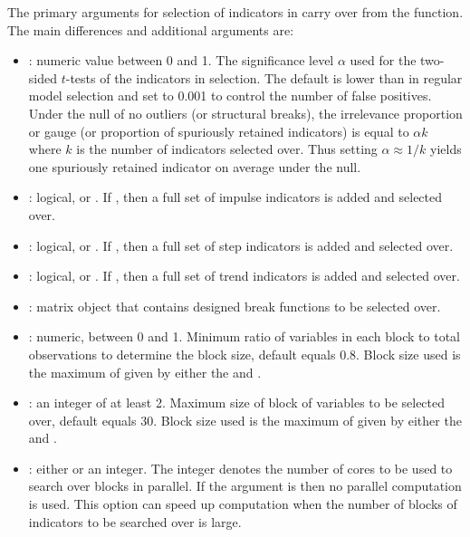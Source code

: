 \documentclass[article,nojss]{jss}
\begin{document}
The primary arguments for selection of indicators in  carry over from the  function. The main differences and additional arguments are:
%
\begin{itemize}
\item {}: numeric value between 0 and 1. The significance
  level $\alpha$ used for the two-sided $t$-tests of the indicators in
  selection. The default is lower than in regular  model
  selection and set to 0.001 to control the number of false
  positives. Under the null of no outliers (or structural breaks), the
  irrelevance proportion or gauge (or proportion of spuriously
  retained indicators) is equal to $\alpha k$ where $k$ is the number
  of indicators selected over. Thus setting $\alpha \approx 1/k$
  yields one spuriously retained indicator on average under the null.
	
\item {}: logical,  or . If
  , then a full set of impulse indicators is added and
  selected over.
	
\item {}: logical,  or . If
  , then a full set of step indicators is added and
  selected over.
	
\item {}: logical,  or . If
  , then a full set of trend indicators is added and
  selected over.
	
\item {}: matrix object that contains designed break functions
  to be selected over.
	
\item {}: numeric, between 0 and 1. Minimum ratio
  of variables in each block to total observations to determine the
  block size, default equals 0.8. Block size used is the maximum of
  given by either the  and .
	
\item {}: an integer of at least 2. Maximum size of
  block of variables to be selected over, default equals 30. Block
  size used is the maximum of given by either the  and
  .

\item{}: either  or an integer. The integer 
denotes the number of cores to be used to search over blocks in parallel. 
If the argument is  then no parallel computation is used. This 
option can speed up computation when the number of blocks of indicators to 
be searched over is large.  
  
\end{itemize}
\end{document}
